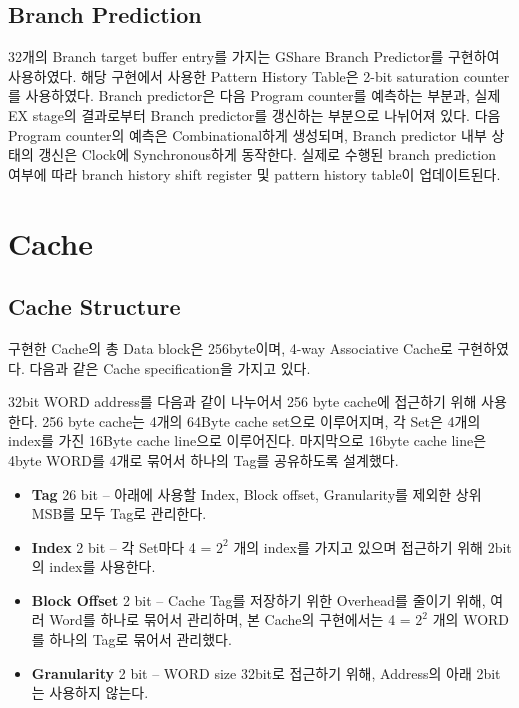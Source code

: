\documentclass{scrartcl}
\begin{document}
\subsection{Branch Prediction}
32개의 Branch target buffer entry를 가지는 GShare Branch Predictor를 구현하여 사용하였다. 해당 구현에서 사용한 Pattern History Table은 2-bit saturation counter를 사용하였다.
Branch predictor은 다음 Program counter를 예측하는 부분과, 실제 EX stage의 결과로부터 Branch predictor를 갱신하는 부분으로 나뉘어져 있다.
다음 Program counter의 예측은 Combinational하게 생성되며, Branch predictor 내부 상태의 갱신은 Clock에 Synchronous하게 동작한다.
실제로 수행된 branch prediction 여부에 따라 branch history shift register 및 pattern history table이 업데이트된다.

\section{Cache}
\subsection{Cache Structure}
구현한 Cache의 총 Data block은 256byte이며, 4-way Associative Cache로 구현하였다. 다음과 같은 Cache specification을 가지고 있다.

32bit WORD address를 다음과 같이 나누어서 256 byte cache에 접근하기 위해 사용한다.
256 byte cache는 4개의 64Byte cache set으로 이루어지며, 각 Set은 4개의 index를 가진 16Byte cache line으로 이루어진다.
마지막으로 16byte cache line은 4byte WORD를 4개로 묶어서 하나의 Tag를 공유하도록 설계했다. 

\begin{itemize}
  \item \textbf{Tag} 26 bit -- 아래에 사용할 Index, Block offset, Granularity를 제외한 상위 MSB를 모두 Tag로 관리한다.
  \item \textbf{Index} 2 bit -- 각 Set마다 4 = $2^{2}$ 개의 index를 가지고 있으며 접근하기 위해 2bit의 index를 사용한다.
  \item \textbf{Block Offset} 2 bit -- Cache Tag를 저장하기 위한 Overhead를 줄이기 위해, 여러 Word를 하나로 묶어서 관리하며, 본 Cache의 구현에서는 4 = $2^{2}$ 개의 WORD를 하나의 Tag로 묶어서 관리했다.
  \item \textbf{Granularity} 2 bit -- WORD size 32bit로 접근하기 위해, Address의 아래 2bit는 사용하지 않는다.
\end{itemize}
\end{document}
